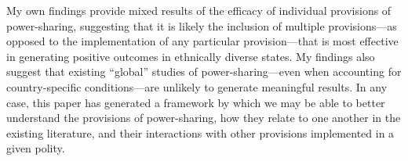 \documentclass[12pt]{article}
\begin{document}
My own findings provide mixed results of the efficacy of individual provisions of power-sharing, suggesting that it is likely the inclusion of multiple provisions—as opposed to the implementation of any particular provision—that is most effective in generating positive outcomes in ethnically diverse states. My findings also suggest that existing “global” studies of power-sharing—even when accounting for country-specific conditions—are unlikely to generate meaningful results. In any case, this paper has generated a framework by which we may be able to better understand the provisions of power-sharing, how they relate to one another in the existing literature, and their interactions with other provisions implemented in a given polity.




\pagebreak
{}

\nocite{*}
% 
\end{document}
